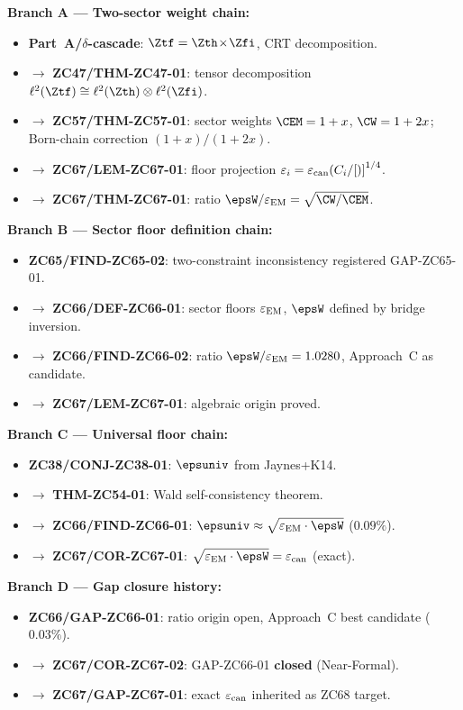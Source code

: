 \documentclass[12pt, a4paper]{article}
\renewcommand{\epsEM}{\varepsilon_{\rm EM}}
\renewcommand{\epscan}{\varepsilon_{\rm can}}
\begin{document}
\begin{genealogybox}[title={How ZC67's Key Objects Trace Back}]

\textbf{Branch A --- Two-sector weight chain:}
\begin{itemize}[leftmargin=2em, noitemsep]
  \item \textbf{Part~A/$\delta$-cascade}:
    $\Ztf = \Zth\!\times\!\Zfi$, CRT decomposition.
  \item $\to$ \textbf{ZC47/THM-ZC47-01}:
    tensor decomposition $\ell^{2}(\Ztf)
    \cong \ell^{2}(\Zth)\otimes\ell^{2}(\Zfi)$.
  \item $\to$ \textbf{ZC57/THM-ZC57-01}:
    sector weights $\CEM = 1+x$, $\CW = 1+2x$;
    Born-chain correction $(1+x)/(1+2x)$.
  \item $\to$ \textbf{ZC67/LEM-ZC67-01}:
    floor projection $\varepsilon_i = \epscan(C_i/\Cref)^{1/4}$.
  \item $\to$ \textbf{ZC67/THM-ZC67-01}:
    ratio $\epsW/\epsEM = \sqrt{\CW/\CEM}$.
\end{itemize}

\textbf{Branch B --- Sector floor definition chain:}
\begin{itemize}[leftmargin=2em, noitemsep]
  \item \textbf{ZC65/FIND-ZC65-02}: two-constraint
    inconsistency registered GAP-ZC65-01.
  \item $\to$ \textbf{ZC66/DEF-ZC66-01}: sector floors
    $\epsEM$, $\epsW$ defined by bridge inversion.
  \item $\to$ \textbf{ZC66/FIND-ZC66-02}: ratio $\epsW/\epsEM = 1.0280$,
    Approach~C as candidate.
  \item $\to$ \textbf{ZC67/LEM-ZC67-01}: algebraic origin proved.
\end{itemize}

\textbf{Branch C --- Universal floor chain:}
\begin{itemize}[leftmargin=2em, noitemsep]
  \item \textbf{ZC38/CONJ-ZC38-01}: $\epsuniv$ from Jaynes+K14.
  \item $\to$ \textbf{THM-ZC54-01}: Wald self-consistency theorem.
  \item $\to$ \textbf{ZC66/FIND-ZC66-01}:
    $\epsuniv \approx \sqrt{\epsEM\cdot\epsW}$ ($0.09\%$).
  \item $\to$ \textbf{ZC67/COR-ZC67-01}:
    $\sqrt{\epsEM\cdot\epsW} = \epscan$ (exact).
\end{itemize}

\textbf{Branch D --- Gap closure history:}
\begin{itemize}[leftmargin=2em, noitemsep]
  \item \textbf{ZC66/GAP-ZC66-01}: ratio origin open,
    Approach~C best candidate ($0.03\%$).
  \item $\to$ \textbf{ZC67/COR-ZC67-02}:
    GAP-ZC66-01 \textbf{closed} (Near-Formal).
  \item $\to$ \textbf{ZC67/GAP-ZC67-01}:
    exact $\epscan$ inherited as ZC68 target.
\end{itemize}


\end{genealogybox}
\end{document}
